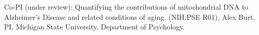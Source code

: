 

\item Co-PI (under review): Quantifying the contributions of mitochondrial DNA to Alzheimer's Disease and related conditions of aging. (NIH:PSE R01), Alex Burt, PI, Michigan State University, Department of Psychology.  %


